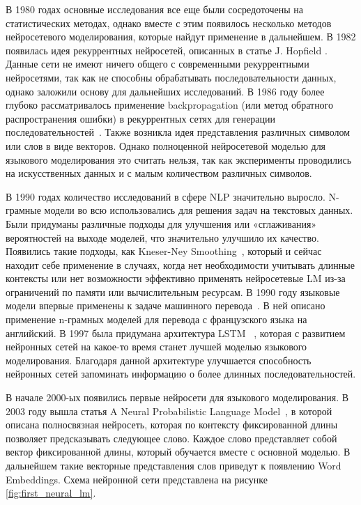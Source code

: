 В 1980 годах основные исследования все еще были сосредоточены на статистических методах, однако вместе с этим появилось несколько методов нейросетевого моделирования, которые найдут применение в дальнейшем. В 1982 появилась идея рекуррентных нейросетей, описанных в статье J. Hopfield \cite{hopfield_rnn}. Данные сети не имеют ничего общего с современными рекуррентными нейросетями, так как не способны обрабатывать последовательности данных, однако заложили основу для дальнейших исследований. В 1986 году более глубоко рассматривалось применение backpropagation (или метод обратного распространения ошибки) в рекуррентных сетях для генерации последовательностей~\cite{rumelhart_backprop}. Также возникла идея представления различных символом или слов в виде векторов. Однако полноценной нейросетевой моделью для языкового моделирования это считать нельзя, так как эксперименты проводились на искусственных данных и с малым количеством различных символов.

В 1990 годах количество исследований в сфере NLP значительно выросло. N-грамные модели во всю использовались для решения задач на текстовых данных. Были придуманы различные подходы для улучшения или «сглаживания» вероятностей на выходе моделей, что значительно улучшило их качество. Появились такие подходы, как Kneser-Ney Smoothing~\cite{kneser_ney}, который и сейчас находит себе применение в случаях, когда нет необходимости учитывать длинные контексты или нет возможности эффективно применять нейросетевые LM из-за ограничений по памяти или вычислительным ресурсам. В 1990 году языковые модели впервые применены к задаче машинного перевода~\cite{mt_first}. В ней описано применение n-грамных моделей для перевода с французского языка на английский. В 1997 была придумана архитектура LSTM ~\cite{lstm}, которая с развитием нейронных сетей на какое-то время станет лучшей моделью языкового моделирования. Благодаря данной архитектуре улучшается способность нейронных сетей запоминать информацию о более длинных последовательностей.

В начале 2000-ых появились первые нейросети для языкового моделирования. В 2003 году вышла статья A Neural Probabilistic Language Model~\cite{first_neural_lm}, в которой описана полносвязная нейросеть, которая по контексту фиксированной длины позволяет предсказывать следующее слово. Каждое слово представляет собой вектор фиксированной длины, который обучается вместе с основной моделью. В дальнейшем такие векторные представления слов приведут к появлению Word Embeddings. Схема нейронной сети представлена на рисунке \ref{fig:first_neural_lm}.

